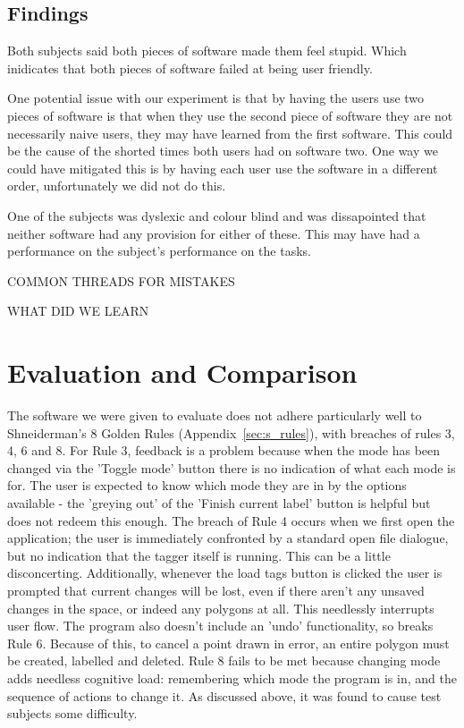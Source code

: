 \documentclass[a4paper,11pt,oneside]{article}
\begin{document}
\subsection{Findings}
Both subjects said both pieces of software made them feel stupid.  Which inidicates that both pieces of software failed at being user friendly.

One potential issue with our experiment is that by having the users use two pieces of software is that when they use the second piece of software they are not necessarily naive users, they may have learned from the first software.  This could be the cause of the shorted times both users had on software two.  One way we could have mitigated this is by having each user use the software in a different order, unfortunately we did not do this.

One of the subjects was dyslexic and colour blind and was dissapointed that neither software had any provision for either of these.  This may have had a performance on the subject's performance on the tasks.

COMMON THREADS FOR MISTAKES

WHAT DID WE LEARN

\section{Evaluation and Comparison}

The software we were given to evaluate does not adhere particularly well to Shneiderman's 8 Golden Rules (Appendix~\ref{sec:s_rules}), with breaches of rules 3, 4, 6 and 8. For Rule 3, feedback is a problem because when the mode has been changed via the 'Toggle mode' button there is no indication of what each mode is for. The user is expected to know which mode they are in by the options available - the 'greying out' of the 'Finish current label' button is helpful but does not redeem this enough. The breach of Rule 4 occurs when we first open the application; the user is immediately confronted by a standard open file dialogue, but no indication that the tagger itself is running. This can be a little disconcerting. Additionally, whenever the load tags button is clicked the user is prompted that current changes will be lost, even if there aren't any unsaved changes in the space, or indeed any polygons at all. This needlessly interrupts user flow. The program also doesn't include an 'undo' functionality, so breaks Rule 6. Because of this, to cancel a point drawn in error, an entire polygon must be created, labelled and deleted. Rule 8 fails to be met because changing mode adds needless cognitive load: remembering which mode the program is in, and the sequence of actions to change it. As discussed above, it was found to cause test subjects some difficulty.
\end{document}
